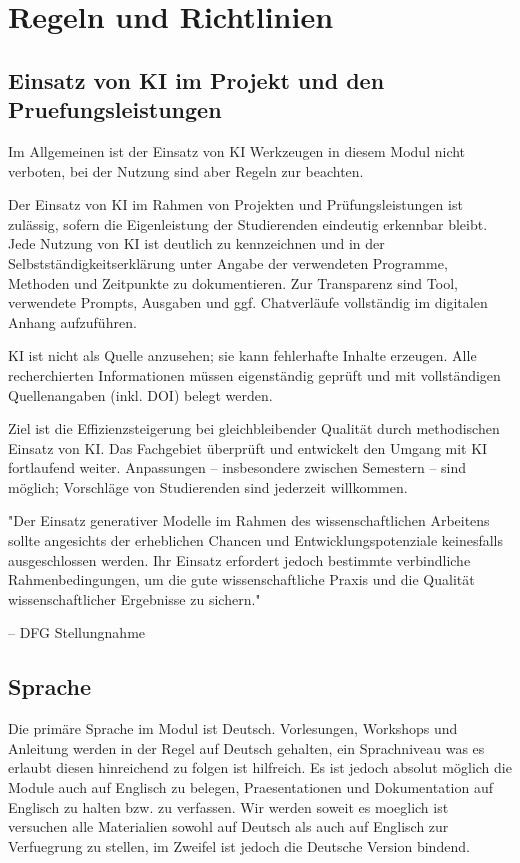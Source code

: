 \section{Regeln und Richtlinien}

\subsection{Einsatz von KI im Projekt und den Pruefungsleistungen}
Im Allgemeinen ist der Einsatz von KI Werkzeugen in diesem Modul nicht verboten, bei der Nutzung sind aber Regeln zur beachten. 

Der Einsatz von KI im Rahmen von Projekten und Prüfungsleistungen ist zulässig, sofern die Eigenleistung der Studierenden eindeutig erkennbar bleibt. Jede Nutzung von KI ist deutlich zu kennzeichnen und in der Selbstständigkeitserklärung unter Angabe der verwendeten Programme, Methoden und Zeitpunkte zu dokumentieren. Zur Transparenz sind Tool, verwendete Prompts, Ausgaben und ggf. Chatverläufe vollständig im digitalen Anhang aufzuführen.

KI ist nicht als Quelle anzusehen; sie kann fehlerhafte Inhalte erzeugen. Alle recherchierten Informationen müssen eigenständig geprüft und mit vollständigen Quellenangaben (inkl. DOI) belegt werden.

Ziel ist die Effizienzsteigerung bei gleichbleibender Qualität durch methodischen Einsatz von KI. Das Fachgebiet überprüft und entwickelt den Umgang mit KI fortlaufend weiter. Anpassungen – insbesondere zwischen Semestern – sind möglich; Vorschläge von Studierenden sind jederzeit willkommen.

\epigraph{"Der Einsatz generativer Modelle im Rahmen des
wissenschaftlichen Arbeitens sollte angesichts der erheblichen
Chancen und Entwicklungspotenziale keinesfalls
ausgeschlossen werden. Ihr Einsatz erfordert jedoch bestimmte
verbindliche Rahmenbedingungen, um die gute
wissenschaftliche Praxis und die Qualität wissenschaftlicher
Ergebnisse zu sichern."}{-- DFG Stellungnahme}

\subsection{Sprache}
Die primäre Sprache im Modul ist Deutsch. Vorlesungen, Workshops und Anleitung werden in der Regel auf Deutsch gehalten, ein Sprachniveau was es erlaubt diesen hinreichend zu folgen ist hilfreich. Es ist jedoch absolut möglich die Module auch auf Englisch zu belegen, Praesentationen und Dokumentation auf Englisch zu halten bzw. zu verfassen. Wir werden soweit es moeglich ist versuchen alle Materialien sowohl auf Deutsch als auch auf Englisch zur Verfuegrung zu stellen, im Zweifel ist jedoch die Deutsche Version bindend. 

